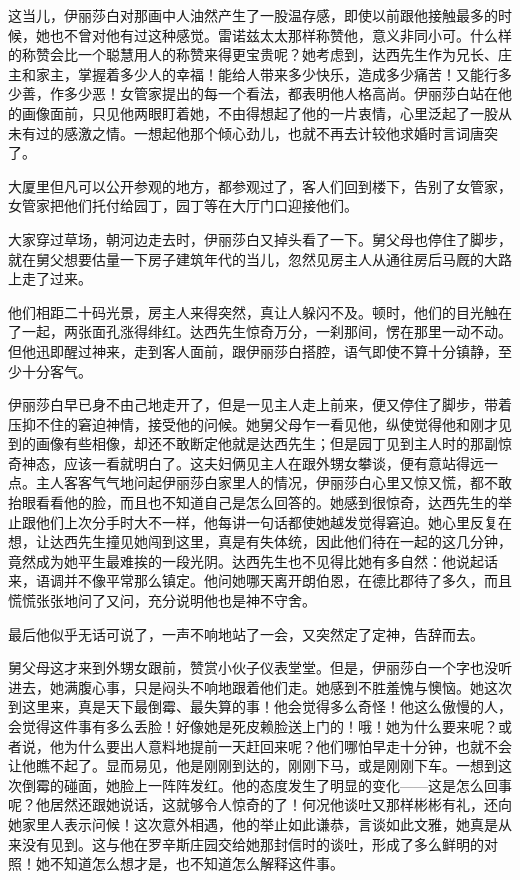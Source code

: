 \par 这当儿，伊丽莎白对那画中人油然产生了一股温存感，即使以前跟他接触最多的时候，她也不曾对他有过这种感觉。雷诺兹太太那样称赞他，意义非同小可。什么样的称赞会比一个聪慧用人的称赞来得更宝贵呢？她考虑到，达西先生作为兄长、庄主和家主，掌握着多少人的幸福！能给人带来多少快乐，造成多少痛苦！又能行多少善，作多少恶！女管家提出的每一个看法，都表明他人格高尚。伊丽莎白站在他的画像面前，只见他两眼盯着她，不由得想起了他的一片衷情，心里泛起了一股从未有过的感激之情。一想起他那个倾心劲儿，也就不再去计较他求婚时言词唐突了。
\par 大厦里但凡可以公开参观的地方，都参观过了，客人们回到楼下，告别了女管家，女管家把他们托付给园丁，园丁等在大厅门口迎接他们。
\par 大家穿过草场，朝河边走去时，伊丽莎白又掉头看了一下。舅父母也停住了脚步，就在舅父想要估量一下房子建筑年代的当儿，忽然见房主人从通往房后马厩的大路上走了过来。
\par 他们相距二十码光景，房主人来得突然，真让人躲闪不及。顿时，他们的目光触在了一起，两张面孔涨得绯红。达西先生惊奇万分，一刹那间，愣在那里一动不动。但他迅即醒过神来，走到客人面前，跟伊丽莎白搭腔，语气即使不算十分镇静，至少十分客气。
\par 伊丽莎白早已身不由己地走开了，但是一见主人走上前来，便又停住了脚步，带着压抑不住的窘迫神情，接受他的问候。她舅父母乍一看见他，纵使觉得他和刚才见到的画像有些相像，却还不敢断定他就是达西先生；但是园丁见到主人时的那副惊奇神态，应该一看就明白了。这夫妇俩见主人在跟外甥女攀谈，便有意站得远一点。主人客客气气地问起伊丽莎白家里人的情况，伊丽莎白心里又惊又慌，都不敢抬眼看看他的脸，而且也不知道自己是怎么回答的。她感到很惊奇，达西先生的举止跟他们上次分手时大不一样，他每讲一句话都使她越发觉得窘迫。她心里反复在想，让达西先生撞见她闯到这里，真是有失体统，因此他们待在一起的这几分钟，竟然成为她平生最难挨的一段光阴。达西先生也不见得比她有多自然：他说起话来，语调并不像平常那么镇定。他问她哪天离开朗伯恩，在德比郡待了多久，而且慌慌张张地问了又问，充分说明他也是神不守舍。
\par 最后他似乎无话可说了，一声不响地站了一会，又突然定了定神，告辞而去。
\par 舅父母这才来到外甥女跟前，赞赏小伙子仪表堂堂。但是，伊丽莎白一个字也没听进去，她满腹心事，只是闷头不响地跟着他们走。她感到不胜羞愧与懊恼。她这次到这里来，真是天下最倒霉、最失算的事！他会觉得多么奇怪！他这么傲慢的人，会觉得这件事有多么丢脸！好像她是死皮赖脸送上门的！哦！她为什么要来呢？或者说，他为什么要出人意料地提前一天赶回来呢？他们哪怕早走十分钟，也就不会让他瞧不起了。显而易见，他是刚刚到达的，刚刚下马，或是刚刚下车。一想到这次倒霉的碰面，她脸上一阵阵发红。他的态度发生了明显的变化——这是怎么回事呢？他居然还跟她说话，这就够令人惊奇的了！何况他谈吐又那样彬彬有礼，还向她家里人表示问候！这次意外相遇，他的举止如此谦恭，言谈如此文雅，她真是从来没有见到。这与他在罗辛斯庄园交给她那封信时的谈吐，形成了多么鲜明的对照！她不知道怎么想才是，也不知道怎么解释这件事。
